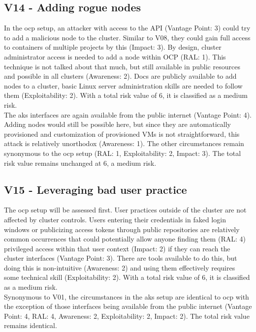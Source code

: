 \subsection{V14 - Adding rogue nodes}

In the \gls{ocp} setup, an attacker with access to the API (Vantage Point: 3) could try to add a malicious node to the cluster. Similar to V08, they could gain full access to containers of multiple projects by this (Impact: 3).
By design, cluster administrator access is needed to add a node within OCP (RAL: 1).
This technique is not talked about that much, but still available in public resources and possible in all clusters (Awareness: 2). Docs are publicly available to add nodes to a cluster, basic Linux server administration skills are needed to follow them (Exploitability: 2).
With a total risk value of 6, it is classified as a medium risk. \\
The \gls{aks} interfaces are again available from the public internet (Vantage Point: 4).
Adding nodes would still be possible here, but since they are automatically provisioned and customization of provisioned VMs is not straightforward, this attack is relatively unorthodox (Awareness: 1).
The other circumstances remain synonymous to the \gls{ocp} setup (RAL: 1, Exploitability: 2, Impact: 3).
The total risk value remains unchanged at 6, a medium risk.

\subsection{V15 - Leveraging bad user practice}

The \gls{ocp} setup will be assessed first.
User practices outside of the cluster are not affected by cluster controls. Users entering their credentials in faked login windows or publicizing access tokens through public repositories are relatively common occurrences that could potentially allow anyone finding them (RAL: 4) privileged access within that user context (Impact: 2) if they can reach the cluster interfaces (Vantage Point: 3).
There are tools available to do this, but doing this is non-intuitive (Awareness: 2) and using them effectively requires some technical skill (Exploitability: 2).
With a total risk value of 6, it is classified as a medium risk. \\
Synonymous to V01, the circumstances in the \gls{aks} setup are identical to \gls{ocp} with the exception of those interfaces being available from the public internet (Vantage Point: 4, RAL: 4, Awareness: 2, Exploitability: 2, Impact: 2). 
The total risk value remains identical.

